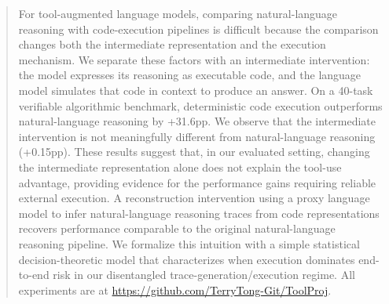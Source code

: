 \begin{abstract}

For tool-augmented language models, comparing natural-language reasoning with code-execution pipelines is difficult because the comparison changes both the intermediate representation and the execution mechanism. We separate these factors with an intermediate intervention: the model expresses its reasoning as executable code, and the language model simulates that code in context to produce an answer. On a 40-task verifiable algorithmic benchmark, deterministic code execution outperforms natural-language reasoning by +31.6pp. We observe that the intermediate intervention is not meaningfully different from natural-language reasoning (+0.15pp). These results suggest that, in our evaluated setting, changing the intermediate representation alone does not explain the tool-use advantage, providing evidence for the performance gains requiring reliable external execution. A reconstruction intervention using a proxy language model to infer natural-language reasoning traces from code representations recovers performance comparable to the original natural-language reasoning pipeline. We formalize this intuition with a simple statistical decision-theoretic model that characterizes when execution dominates end-to-end risk in our disentangled trace-generation/execution regime. All experiments are at \url{https://github.com/TerryTong-Git/ToolProj}.




\end{abstract}

